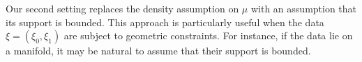 Our second setting replaces the density assumption on \(\mu\) with an assumption that its support is bounded. This approach is particularly useful when the data \(\xi = (\xi_{0}, \xi_{1})\) are subject to geometric constraints. For instance, if the data lie on a manifold, it may be natural to assume that their support is bounded.







